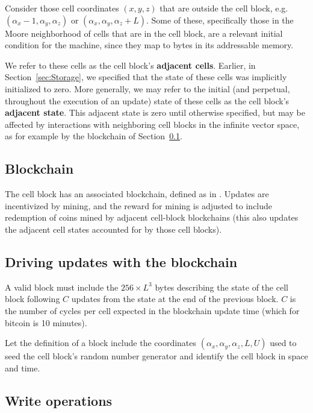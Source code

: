 \documentclass{article}
\begin{document}
Consider those cell coordinates $(x,y,z)$ that are outside the cell block,
e.g. $(\alpha_x-1,\alpha_y,\alpha_z)$ or  $(\alpha_x,\alpha_y,\alpha_z + L)$.
Some of these, specifically those in the Moore neighborhood of cells that are in the cell block,
are a relevant initial condition for the machine,
since they map to bytes in its addressable memory.

We refer to these cells as the cell block's {\bf adjacent cells}.
Earlier, in Section~\ref{sec:Storage}, we specified that the state of these cells was implicitly initialized to zero.
More generally, we may refer to the initial (and perpetual, throughout the execution of an update)
state of these cells as the cell block's {\bf adjacent state}.
This adjacent state is zero until otherwise specified, but may be affected
by interactions with neighboring cell blocks in the infinite vector space,
as for example by the blockchain of Section~\ref{sec:Blockchain}.

\subsection{Blockchain}
\label{sec:Blockchain}

The cell block has an associated blockchain, defined as in \cite{Nakamoto2008}.
Updates are incentivized by mining,
and the reward for mining is adjusted to include redemption of coins mined by adjacent cell-block blockchains
(this also updates the adjacent cell states accounted for by those cell blocks).

\subsection{Driving updates with the blockchain}

A valid block must include the $256 \times L^3$ bytes describing the state of the cell block following $C$ updates
from the state at the end of the previous block.
$C$ is the number of cycles per cell expected in the blockchain update time
(which for bitcoin is 10 minutes).

Let the definition of a block include the coordinates $(\alpha_x,\alpha_y,\alpha_z,L,U)$
used to seed the cell block's random number generator and identify the cell block in space and time.

\subsection{Write operations}
\end{document}
